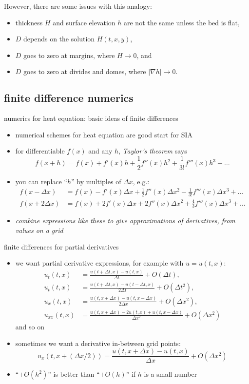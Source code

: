 \documentclass[titlepage,letterpaper,final,12pt]{scrartcl}
\newcommand{\grad}{\nabla}
\begin{document}
However, there are some issues with this analogy:
  \begin{itemize}
  \item thickness $H$ and surface elevation $h$ are not the same unless the bed is flat,
  \item $D$ depends on the solution $H(t,x,y)$,
  \item $D$ goes to zero at margins, where $H\to 0$, and
  \item $D$ goes to zero at divides and domes, where $|\grad h|\to 0$.
  \end{itemize}


\subsection{finite difference numerics}

numerics for heat equation: basic ideas of finite differences

\begin{itemize}
\item numerical schemes for heat equation are good start for SIA
\item for differentiable $f(x)$ and any $h$, \emph{Taylor's theorem} says
	$$f(x+h) = f(x) + f'(x) h + \frac{1}{2} f''(x) h^2 + \frac{1}{3!} f'''(x) h^3 + \dots$$
\item you can replace ``$h$'' by multiples of $\Delta x$, e.g.:
\begin{align*}
f(x-\Delta x) &= f(x) - f'(x) \Delta x + \frac{1}{2} f''(x) \Delta x^2 - \frac{1}{3!} f'''(x) \Delta x^3 + \dots \\
f(x+2\Delta x) &= f(x) + 2 f'(x) \Delta x + 2 f''(x) \Delta x^2 + \frac{4}{3} f'''(x) \Delta x^3 + \dots
\end{align*}
\item \emph{combine expressions like these to give approximations of derivatives, from values on a grid}
\end{itemize}

finite differences for partial derivatives

\begin{itemize}
\item we want partial derivative expressions, for example with $u=u(t,x)$:
\begin{align*}
u_t(t,x) &= \frac{u(t+\Delta t,x) - u(t,x)}{\Delta t} + O(\Delta t), \\
u_t(t,x) &= \frac{u(t+\Delta t,x) - u(t-\Delta t,x)}{2\Delta t} + O(\Delta t^2), \\
u_x(t,x) &= \frac{u(t,x+\Delta x) - u(t,x-\Delta x)}{2\Delta x} + O(\Delta x^2), \\
u_{xx}(t,x) &= \frac{u(t,x+\Delta x) - 2 u(t,x) + u(t,x-\Delta x)}{\Delta x^2} + O(\Delta x^2)
\end{align*}
and so on
\item sometimes we want a derivative in-between grid points:
	$$u_x(t,x+(\Delta x/2)) = \frac{u(t,x+\Delta x) - u(t,x)}{\Delta x} + O(\Delta x^2)$$
\item ``$+O(h^2)$'' is better than ``$+O(h)$'' if $h$ is a small number
\end{itemize}
\end{document}
